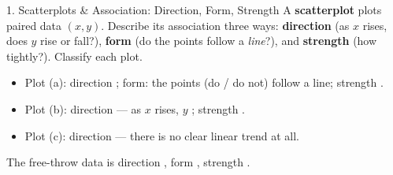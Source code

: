 \documentclass[10pt]{article}
\newcommand{\lgrid}[4]{%
  \draw[step=1, linegray!40, very thin] (#1,#3) grid (#2,#4);
  \draw[->, semithick, charcoal] (#1,0)--(#2,0) node[below right, font=\scriptsize]{$x$};
  \draw[->, semithick, charcoal] (0,#3)--(0,#4) node[left, font=\scriptsize]{$y$};}
\newcommand{\dpt}[2]{\fill[navy] (#1,#2) circle (2.6pt);}
\begin{document}
\boxguard[24]
\begin{notesbox}{1. Scatterplots \& Association: Direction, Form, Strength}
A \textbf{scatterplot} plots paired data $(x,y)$. Describe its association three ways:
\textbf{direction} (as $x$ rises, does $y$ rise or fall?), \textbf{form} (do the points follow a
\emph{line}?), and \textbf{strength} (how tightly?). Classify each plot.
\begin{center}
\hspace{0.4cm}
\hspace{0.4cm}
\end{center}
\begin{itemize}[leftmargin=1.5em, itemsep=2pt]
  \item Plot (a): direction \blank{1.8cm}; form: the points \blank{1.2cm} (do / do not) follow
        a line; strength \blank{1.4cm}.
  \item Plot (b): direction \blank{1.8cm} --- as $x$ rises, $y$ \blank{1.2cm}; strength
        \blank{1.4cm}.
  \item Plot (c): direction \blank{1.8cm} --- there is no clear linear trend at all.
\end{itemize}
The free-throw data is direction \blank{1.6cm}, form \blank{1.4cm}, strength \blank{1.4cm}.
\end{notesbox}
\end{document}
